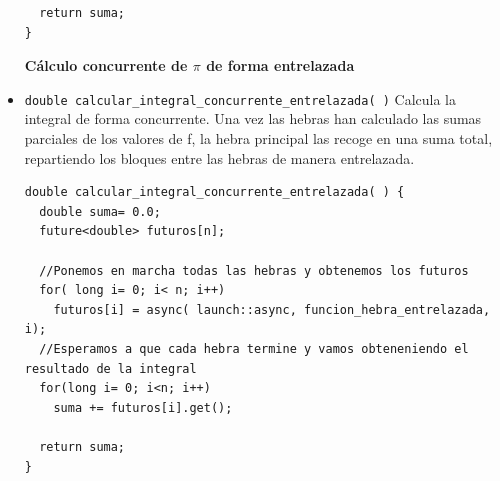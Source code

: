 \documentclass[12pt]{article}
\begin{document}
\begin{itemize}[wide, nosep, labelindent = 0pt, topsep = 1ex]
\begin{lstlisting}
  return suma;
}
\end{lstlisting}
\item[\textbf{Cálculo concurrente de $\pi$ de forma entrelazada}]
\item \verb|double calcular_integral_concurrente_entrelazada( )| Calcula la integral de forma concurrente. Una vez las hebras han calculado las sumas parciales de los valores de f, la hebra principal las recoge en una suma total,
repartiendo los bloques entre las hebras de manera entrelazada.
\begin{lstlisting}
double calcular_integral_concurrente_entrelazada( ) {
  double suma= 0.0;
  future<double> futuros[n];

  //Ponemos en marcha todas las hebras y obtenemos los futuros
  for( long i= 0; i< n; i++)
    futuros[i] = async( launch::async, funcion_hebra_entrelazada, i);
  //Esperamos a que cada hebra termine y vamos obteneniendo el resultado de la integral
  for(long i= 0; i<n; i++)
    suma += futuros[i].get();

  return suma;
}
\end{lstlisting}

\end{itemize}
\end{document}
